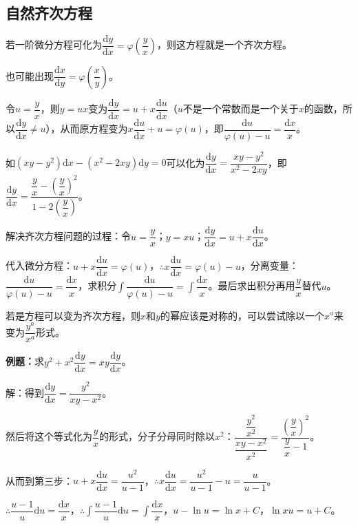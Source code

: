 \documentclass[UTF8, 12pt]{ctexart}
\begin{document}
        \subsection{自然齐次方程}

        若一阶微分方程可化为$\dfrac{\textrm{d}y}{\textrm{d}x}=\varphi\left(\dfrac{y}{x}\right)$，则这方程就是一个齐次方程。

        也可能出现$\dfrac{\textrm{d}x}{\textrm{d}y}=\varphi\left(\dfrac{x}{y}\right)$。

        令$u=\dfrac{y}{x}$，则$y=ux$变为$\dfrac{\textrm{d}y}{\textrm{d}x}=u+x\dfrac{\textrm{d}u}{\textrm{d}x}$（$u$不是一个常数而是一个关于$x$的函数，所以$\dfrac{\textrm{d}y}{\textrm{d}x}\neq u$），从而原方程变为$x\dfrac{\textrm{d}u}{\textrm{d}x}+u=\varphi(u)$，即$\dfrac{\textrm{d}u}{\varphi(u)-u}=\dfrac{\textrm{d}x}{x}$。

        如$(xy-y^2)\textrm{d}x-(x^2-2xy)\textrm{d}y=0$可以化为$\dfrac{\textrm{d}y}{\textrm{d}x}=\dfrac{xy-y^2}{x^2-2xy}$，即$\dfrac{\textrm{d}y}{\textrm{d}x}=\dfrac{\dfrac{y}{x}-\left(\dfrac{y}{x}\right)^2}{1-2\left(\dfrac{y}{x}\right)}$。

        解决齐次方程问题的过程：令$u=\dfrac{y}{x}$；$y=xu$；$\dfrac{\textrm{d}y}{\textrm{d}x}=u+x\dfrac{\textrm{d}u}{\textrm{d}x}$。

        代入微分方程：$u+x\dfrac{\textrm{d}u}{\textrm{d}x}=\varphi(u)$，$\therefore x\dfrac{\textrm{d}u}{\textrm{d}x}=\varphi(u)-u$，分离变量：$\dfrac{\textrm{d}u}{\varphi(u)-u}=\dfrac{\textrm{d}x}{x}$，求积分$\displaystyle{\int\dfrac{\textrm{d}u}{\varphi(u)-u}=\int\dfrac{\textrm{d}x}{x}}$。最后求出积分再用$\dfrac{y}{x}$替代$u$。

        若是方程可以变为齐次方程，则$x$和$y$的幂应该是对称的，可以尝试除以一个$x^a$来变为$\dfrac{y^a}{x^a}$形式。

        \textbf{例题：}求$y^2+x^2\dfrac{\textrm{d}y}{\textrm{d}x}=xy\dfrac{\textrm{d}y}{\textrm{d}x}$。

        解：得到$\dfrac{\textrm{d}y}{\textrm{d}x}=\dfrac{y^2}{xy-x^2}$。

        然后将这个等式化为$\dfrac{y}{x}$的形式，分子分母同时除以$x^2$：$\dfrac{\dfrac{y^2}{x^2}}{\dfrac{xy-x^2}{x^2}}=\dfrac{\left(\dfrac{y}{x}\right)^2}{\dfrac{y}{x}-1}$。

        从而到第三步：$u+x\dfrac{\textrm{d}u}{\textrm{d}x}=\dfrac{u^2}{u-1}$，$\therefore x\dfrac{\textrm{d}u}{\textrm{d}x}=\dfrac{u^2}{u-1}-u=\dfrac{u}{u-1}$。

        $\therefore\dfrac{u-1}{u}\textrm{d}u=\dfrac{\textrm{d}x}{x}$，$\therefore\displaystyle{\int\dfrac{u-1}{u}\textrm{d}u=\int\dfrac{\textrm{d}x}{x}}$，$u-\ln u=\ln x+C$，$\ln xu=u+C$。
\end{document}
